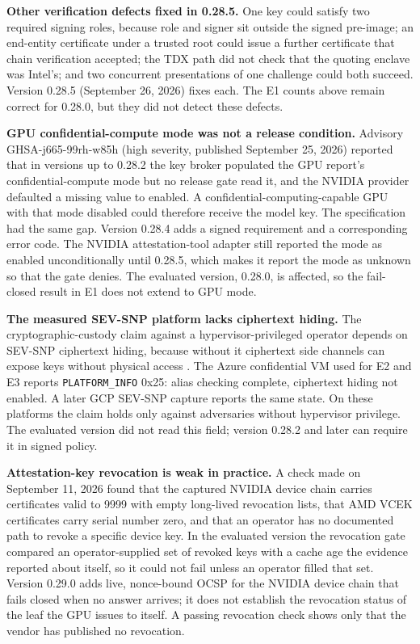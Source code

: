 \documentclass[10pt,letterpaper]{article}
\begin{document}
\textbf{Other verification defects fixed in 0.28.5.} One key could satisfy two required signing roles, because role and signer sit outside the signed pre-image; an end-entity certificate under a trusted root could issue a further certificate that chain verification accepted; the TDX path did not check that the quoting enclave was Intel's; and two concurrent presentations of one challenge could both succeed. Version 0.28.5 (September 26, 2026) fixes each. The E1 counts above remain correct for 0.28.0, but they did not detect these defects.

\textbf{GPU confidential-compute mode was not a release condition.} Advisory GHSA-j665-99rh-w85h (high severity, published September 25, 2026) reported that in versions up to 0.28.2 the key broker populated the GPU report's confidential-compute mode but no release gate read it, and the NVIDIA provider defaulted a missing value to enabled. A confidential-computing-capable GPU with that mode disabled could therefore receive the model key. The specification had the same gap. Version 0.28.4 adds a signed requirement and a corresponding error code. The NVIDIA attestation-tool adapter still reported the mode as enabled unconditionally until 0.28.5, which makes it report the mode as unknown so that the gate denies. The evaluated version, 0.28.0, is affected, so the fail-closed result in E1 does not extend to GPU mode.

\textbf{The measured SEV-SNP platform lacks ciphertext hiding.} The cryptographic-custody claim against a hypervisor-privileged operator depends on SEV-SNP ciphertext hiding, because without it ciphertext side channels can expose keys without physical access \citep{snpciphertext}. The Azure confidential VM used for E2 and E3 reports \texttt{PLATFORM\_INFO} 0x25: alias checking complete, ciphertext hiding not enabled. A later GCP SEV-SNP capture reports the same state. On these platforms the claim holds only against adversaries without hypervisor privilege. The evaluated version did not read this field; version 0.28.2 and later can require it in signed policy.

\textbf{Attestation-key revocation is weak in practice.} A check made on September 11, 2026 found that the captured NVIDIA device chain carries certificates valid to 9999 with empty long-lived revocation lists, that AMD VCEK certificates carry serial number zero, and that an operator has no documented path to revoke a specific device key. In the evaluated version the revocation gate compared an operator-supplied set of revoked keys with a cache age the evidence reported about itself, so it could not fail unless an operator filled that set. Version 0.29.0 adds live, nonce-bound OCSP for the NVIDIA device chain that fails closed when no answer arrives; it does not establish the revocation status of the leaf the GPU issues to itself. A passing revocation check shows only that the vendor has published no revocation.
\end{document}
